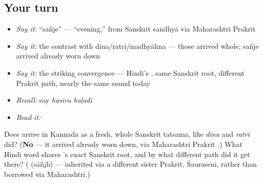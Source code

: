 \subsection*{Your turn}
\begin{itemize}
\raggedright
  \item \emph{Say it:} \textquotedblleft{}sañje\textquotedblright{} — \textquotedblleft{}evening,\textquotedblright{} from Sanskrit sandhyā via Maharashtri Prakrit
  \item \emph{Say it:} the contrast with dina/ratri/madhyāhna — those arrived whole; sañje arrived already worn down
  \item \emph{Say it:} the striking convergence — Hindi's , same Sanskrit root, different Prakrit path, nearly the same sound today
  \item \emph{Recall:} say \emph{hasiru haḷadi}
  \item \emph{Read it:} \textbf{}
\end{itemize}

\begin{tcolorbox}[breakable,colback=teal!4,colframe=teal!35!black,title={Before you move on}]
Does  arrive in Kannada as a fresh, whole Sanskrit tatsama, like \emph{dina} and \emph{ratri} did? (\textbf{No} — it arrived already worn down, via Maharashtri Prakrit .) What Hindi word shares 's exact Sanskrit root, and by what different path did it get there? (\textbf{} (sāñjh) — inherited via a different sister Prakrit, Śauraseni, rather than borrowed via Maharashtri.)
\end{tcolorbox}
